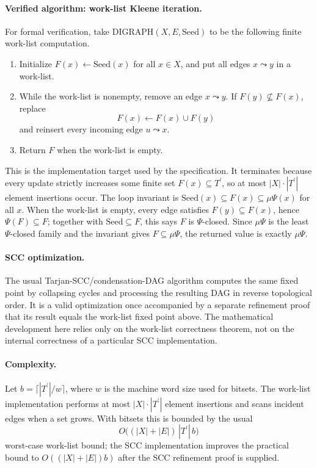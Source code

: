 \documentclass[11pt,a4paper]{article}
\theoremstyle{prettyplain}
\theoremstyle{prettydef}
\begin{document}
\paragraph{Verified algorithm: work-list Kleene iteration.}
For formal verification, take \(\mathrm{DIGRAPH}(X,E,\mathrm{Seed})\) to be the
following finite work-list computation.
\begin{enumerate}
\item Initialize \(F(x)\leftarrow\mathrm{Seed}(x)\) for all \(x\in X\), and put all
      edges \(x\leadsto y\) in a work-list.
\item While the work-list is nonempty, remove an edge \(x\leadsto y\).  If
      \(F(y)\nsubseteq F(x)\), replace
      \[
      F(x)\leftarrow F(x)\cup F(y)
      \]
      and reinsert every incoming edge \(u\leadsto x\).
\item Return \(F\) when the work-list is empty.
\end{enumerate}
This is the implementation target used by the specification.  It terminates
because every update strictly increases some finite set \(F(x)\subseteq T^\prime\),
so at most \(|X|\cdot |T^\prime|\) element insertions occur.  The loop invariant is
\(\mathrm{Seed}(x)\subseteq F(x)\subseteq\mu\Psi(x)\) for all \(x\).  When the
work-list is empty, every edge satisfies \(F(y)\subseteq F(x)\), hence
\(\Psi(F)\subseteq F\); together with \(\mathrm{Seed}\subseteq F\), this says
\(F\) is \(\Psi\)-closed.  Since \(\mu\Psi\) is the least \(\Psi\)-closed family
and the invariant gives \(F\subseteq\mu\Psi\), the returned value is exactly
\(\mu\Psi\).

\paragraph{SCC optimization.}
The usual Tarjan-SCC/condensation-DAG algorithm computes the same fixed point by
collapsing cycles and processing the resulting DAG in reverse topological order.
It is a valid optimization once accompanied by a separate refinement proof that
its result equals the work-list fixed point above.  The mathematical development
here relies only on the work-list correctness theorem, not on the internal
correctness of a particular SCC implementation.

\paragraph{Complexity.}
Let \(b=\lceil |T^\prime|/w\rceil\), where \(w\) is the machine word size used
for bitsets.  The work-list implementation performs at most
\(|X|\cdot |T^\prime|\) element insertions and scans incident edges when a set
grows.  With bitsets this is bounded by the usual
\[
O\bigl((|X|+|E|)\,|T^\prime|\,b\bigr)
\]
worst-case work-list bound; the SCC implementation improves the practical bound
to \(O((|X|+|E|)b)\) after the SCC refinement proof is supplied.
\end{document}
